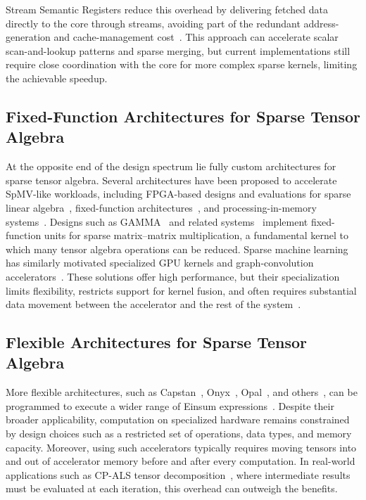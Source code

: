 Stream Semantic Registers reduce this overhead by delivering fetched data directly to the core through streams, avoiding part of the redundant address-generation and cache-management cost~\cite{scheffler2021indirection,scheffler2023sparse,scheffler2024dac,scheffler2025occamy,manoni2025spikestream}. This approach can accelerate scalar scan-and-lookup patterns and sparse merging, but current implementations still require close coordination with the core for more complex sparse kernels, limiting the achievable speedup.

\subsection{Fixed-Function Architectures for Sparse Tensor Algebra} \label{sec:related-work-fixed-function-sparse-architectures}
At the opposite end of the design spectrum lie fully custom architectures for sparse tensor algebra. Several architectures have been proposed to accelerate SpMV-like workloads, including FPGA-based designs and evaluations for sparse linear algebra~\cite{fowers2014fccm,grigoras2015fccm,umuroglu2014energy,parravicini2021dac,sgherzi2021fccm,nguyen2022ccpe}, fixed-function architectures~\cite{nurvitadhi2015sparse,zhang2020hpca,sadi2019micro}, and processing-in-memory systems~\cite{giannoula2022sparsep}. Designs such as GAMMA~\cite{zhang2021asplos} and related systems~\cite{srivastava2020micro,pal2018hpca,zhang2020hpca,lin2010design,qin2020hpca,parashar2017isca,zhang2016micro} implement fixed-function units for sparse matrix--matrix multiplication, a fundamental kernel to which many tensor algebra operations can be reduced. Sparse machine learning has similarly motivated specialized GPU kernels and graph-convolution accelerators~\cite{gale2020sc,li2021hpca}. These solutions offer high performance, but their specialization limits flexibility, restricts support for kernel fusion, and often requires substantial data movement between the accelerator and the rest of the system~\cite{bharadwaj2022ipdps}.

\subsection{Flexible Architectures for Sparse Tensor Algebra} \label{sec:related-work-flexible-sparse-architectures}
More flexible architectures, such as Capstan~\cite{rucker2021micro}, Onyx~\cite{koul2024onyx}, Opal~\cite{chen2025opal}, and others~\cite{dadu2019micro,hegde2019micro,asgari2020hpca,hwang2020isca,mishra2017dac,nurvitadhi2016hardware}, can be programmed to execute a wider range of Einsum expressions~\cite{hsu2023asplos}. Despite their broader applicability, computation on specialized hardware remains constrained by design choices such as a restricted set of operations, data types, and memory capacity. Moreover, using such accelerators typically requires moving tensors into and out of accelerator memory before and after every computation. In real-world applications such as CP-ALS tensor decomposition~\cite{phipps2019software}, where intermediate results must be evaluated at each iteration, this overhead can outweigh the benefits.

